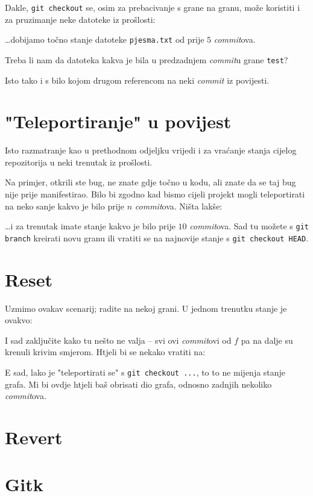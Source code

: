 Dakle, \verb+git checkout+ se, osim za prebacivanje s grane na granu, može koristiti i za pruzimanje neke datoteke iz prošlosti:


\dots{}dobijamo točno stanje datoteke \verb+pjesma.txt+ od prije $5$ \emph{commit}ova.

Treba li nam da datoteka kakva je bila u predzadnjem \emph{commit}u grane \verb+test+?


Isto tako i s bilo kojom drugom referencom na neki \emph{commit} iz povijesti.

\section*{"Teleportiranje" u povijest}

Isto razmatranje kao u prethodnom odjeljku vrijedi i za vraćanje stanja cijelog repozitorija u neki trenutak iz prošlosti.

Na primjer, otkrili ste bug, ne znate gdje točno u kodu, ali znate da se taj bug nije prije manifestirao. 
Bilo bi zgodno kad bismo cijeli projekt mogli teleportirati na neko sanje kakvo je bilo prije $n$ \emph{commit}ova.
Ništa lakše:


\dots{}i za trenutak imate stanje kakvo je bilo prije $10$ \emph{commit}ova. Sad tu možete s \verb+git branch+ kreirati novu granu ili vratiti se na najnovije stanje s \verb+git checkout HEAD+.

\section*{Reset}

Uzmimo ovakav scenarij; radite na nekoj grani.
U jednom trenutku stanje je ovakvo:



I sad zaključite kako tu nešto ne valja -- svi ovi \emph{commit}ovi od $f$ pa na dalje su krenuli krivim smjerom.
Htjeli bi se nekako vratiti na:



E sad, lako je "teleportirati se" s \verb+git checkout ...+, to to ne mijenja stanje grafa. 
Mi bi ovdje htjeli baš obrisati dio grafa, odnosno zadnjih nekoliko \emph{commit}ova.

\section*{Revert}

\section*{Gitk}


